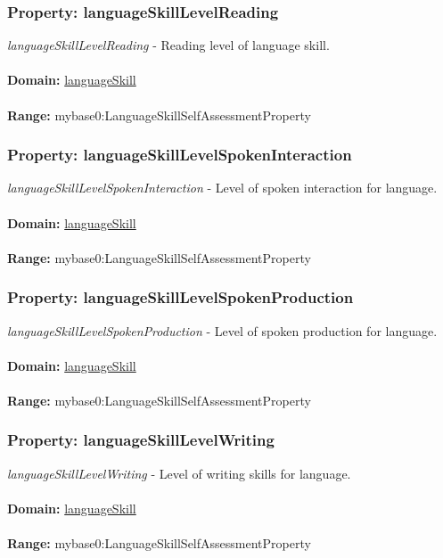 \documentclass[a4paper,12pt]{article}
\numberwithin{equation}{section}
\begin{document}
\subsubsection{Property: languageSkillLevelReading}\hypertarget{languageSkillLevelReading}{}
\textit{languageSkillLevelReading} - Reading level of language skill.
\\\\
\textbf{Domain:} \hyperlink{languageSkill}{languageSkill} 
\\\\
\textbf{Range:}   mybase0:LanguageSkillSelfAssessmentProperty 

\subsubsection{Property: languageSkillLevelSpokenInteraction}\hypertarget{languageSkillLevelSpokenInteraction}{}
\textit{languageSkillLevelSpokenInteraction} - Level of spoken interaction for language.
\\\\
\textbf{Domain:} \hyperlink{languageSkill}{languageSkill} 
\\\\
\textbf{Range:}   mybase0:LanguageSkillSelfAssessmentProperty 

\subsubsection{Property: languageSkillLevelSpokenProduction}\hypertarget{languageSkillLevelSpokenProduction}{}
\textit{languageSkillLevelSpokenProduction} - Level of spoken production for language.
\\\\
\textbf{Domain:} \hyperlink{languageSkill}{languageSkill} 
\\\\
\textbf{Range:}   mybase0:LanguageSkillSelfAssessmentProperty 

\subsubsection{Property: languageSkillLevelWriting}\hypertarget{languageSkillLevelWriting}{}
\textit{languageSkillLevelWriting} - Level of writing skills for language.
\\\\
\textbf{Domain:} \hyperlink{languageSkill}{languageSkill} 
\\\\
\textbf{Range:}   mybase0:LanguageSkillSelfAssessmentProperty 
\end{document}
